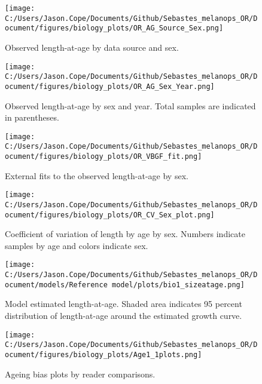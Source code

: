 \documentclass[11pt,
  english,
  letterpaper,
]{article}
\begin{document}
\begin{figure}
\centering
\texttt{[image: C:/Users/Jason.Cope/Documents/Github/Sebastes\_melanops\_OR/Document/figures/biology\_plots/OR\_AG\_Source\_Sex.png]}
\caption{Observed length-at-age by data source and sex.\label{fig:len-age-data-sex}}
\end{figure}

\newpage

\begin{figure}
\centering
\texttt{[image: C:/Users/Jason.Cope/Documents/Github/Sebastes\_melanops\_OR/Document/figures/biology\_plots/OR\_AG\_Sex\_Year.png]}
\caption{Observed length-at-age by sex and year. Total samples are indicated in parentheses.\label{fig:len-age-sex-year}}
\end{figure}

\newpage

\begin{figure}
\centering
\texttt{[image: C:/Users/Jason.Cope/Documents/Github/Sebastes\_melanops\_OR/Document/figures/biology\_plots/OR\_VBGF\_fit.png]}
\caption{External fits to the observed length-at-age by sex.\label{fig:len-age-fit}}
\end{figure}

\newpage

\begin{figure}
\centering
\texttt{[image: C:/Users/Jason.Cope/Documents/Github/Sebastes\_melanops\_OR/Document/figures/biology\_plots/OR\_CV\_Sex\_plot.png]}
\caption{Coefficient of variation of length by age by sex. Numbers indicate samples by age and colors indicate sex.\label{fig:cv-lt-age}}
\end{figure}

\newpage

\begin{figure}
\centering
\texttt{[image: C:/Users/Jason.Cope/Documents/Github/Sebastes\_melanops\_OR/Document/models/Reference model/plots/bio1\_sizeatage.png]}
\caption{Model estimated length-at-age. Shaded area indicates 95 percent distribution of length-at-age around the estimated growth curve.\label{fig:len-age-ss}}
\end{figure}

\clearpage

\begin{figure}
\centering
\texttt{[image: C:/Users/Jason.Cope/Documents/Github/Sebastes\_melanops\_OR/Document/figures/biology\_plots/Age1\_1plots.png]}
\caption{Ageing bias plots by reader comparisons.\label{fig:age1-plot}}
\end{figure}
\end{document}
